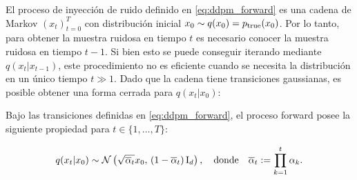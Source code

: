 El proceso de inyección de ruido definido en \eqref{eq:ddpm_forward} es una cadena de Markov $(x_t)_{t=0}^T$ con distribución inicial $x_0\sim q(x_0)=p_{\operatorname{true}}(x_0)$. Por lo tanto, para obtener la muestra ruidosa en tiempo $t$ es necesario conocer la muestra ruidosa en tiempo $t-1$. Si bien esto se puede conseguir iterando mediante $q(x_t|x_{t-1})$, este procedimiento no es eficiente cuando se necesita la distribución en un único tiempo $t\gg 1$. Dado que la cadena tiene transiciones gaussianas, es posible obtener una forma cerrada para $q(x_t|x_0)$:

\begin{prop}
    \label{prop:forward_marginal}
    Bajo las transiciones definidas en \eqref{eq:ddpm_forward}, el proceso forward posee la siguiente propiedad para $t\in\{1,\ldots,T\}$:

    \begin{equation}
        \label{eq:forward_marginal}
        q(x_t|x_0)\sim\mathcal{N}\left(\sqrt{\overline{\alpha}_t}x_0,\,(1-\overline{\alpha}_t)\operatorname{I}_{d}\right),
        \quad\text{donde}\quad
        \overline{\alpha}_t := \prod\limits_{k=1}^t \alpha_k .
    \end{equation}
\end{prop}

